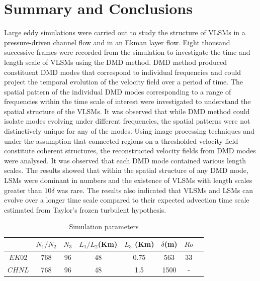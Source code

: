 \section{Summary and Conclusions}
Large eddy simulations were carried out to study the structure of VLSMs in a pressure-driven channel flow and in an Ekman layer flow. Eight thousand successive frames were recorded from the simulation to investigate the time and length scale of VLSMs using the DMD method. DMD method produced constituent DMD modes that correspond to individual frequencies and could project the temporal evolution of the velocity field over a period of time. The spatial pattern of the individual DMD modes corresponding to a range of frequencies within the time scale of interest were investigated to understand the spatial structure of the VLSMs. It was observed that while DMD method could isolate modes evolving under different frequencies, the spatial patterns were not distinctively unique for any of the modes. Using image processing techniques and under the assumption that connected regions on a thresholded velocity field constitute coherent structures, the reconstructed velocity fields from DMD modes were analysed. It was observed that each DMD mode contained various length scales. The results showed that within the spatial structure of any DMD mode, LSMs were dominant in numbers and the existence of VLSMs with length scales greater than $10\delta$ was rare. The results also indicated that VLSMs and LSMs can evolve over a longer time scale compared to their expected advection time scale estimated from Taylor's frozen turbulent hypothesis. 



\clearpage
 

    \begin{table}
    \caption{Simulation parameters}
    \centering
	\begin{tabular}{ c c c c c c c c}
	\hline 
		       & $N_1/N_2$ & $N_3$   & $L_1/L_2$(Km)  & $L_3$ (Km) & $\delta$(m)   & $Ro$ \\
    \hline 
     $EK02$    & 768       &  96     & 48             &  0.75      & 563           & 33  \\
     $CHNL$    & 768       &  96     & 48             &  1.5       & 1500          & - \\
    \hline 
    \hline 
    \end{tabular}
    \label{tab:sim_param}
    \end{table}

